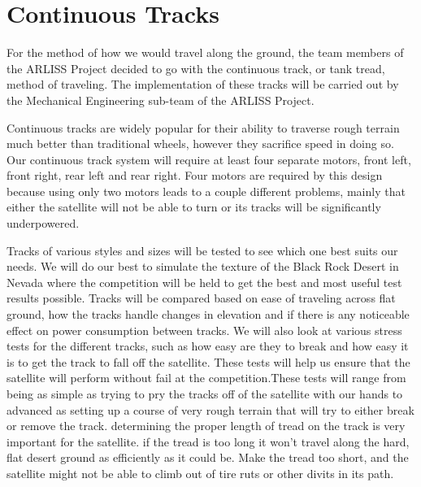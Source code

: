 \documentclass[10pt,letterpaper,onecolumn,journal]{IEEEtran}
\begin{document}
\section{Continuous Tracks}
\par
For the method of how we would travel along the ground, the team members of the ARLISS Project decided to go with the continuous track, or tank tread, method of traveling. The implementation of these tracks will be carried out by the Mechanical Engineering sub-team of the ARLISS Project.\vspace{.3cm}
\par
Continuous tracks are widely popular for their ability to traverse rough terrain much better than traditional wheels, however they sacrifice speed in doing so. Our continuous track system will require at least four separate motors, front left, front right, rear left and rear right. Four motors are required by this design because using only two motors leads to a couple different problems, mainly that either the satellite will not be able to turn or its tracks will be significantly underpowered.\vspace{.3cm}
\par
Tracks of various styles and sizes will be tested to see which one best suits our needs. We will do our best to simulate the texture of the Black Rock Desert in Nevada where the competition will be held to get the best and most useful test results possible. Tracks will be compared based on ease of traveling across flat ground, how the tracks handle changes in elevation and if there is any noticeable effect on power consumption between tracks. We will also look at various stress tests for the different tracks, such as how easy are they to break and how easy it is to get the track to fall off the satellite. These tests will help us ensure that the satellite will perform without fail at the competition.These tests will range from being as simple as trying to pry the tracks off of the satellite with our hands to advanced as setting up a course of very rough terrain that will try to either break or remove the track. determining the proper length of tread on the track is very important for the satellite. if the tread is too long it won't travel along the hard, flat desert ground as efficiently as it could be. Make the tread too short, and the satellite might not be able to climb out of tire ruts or other divits in its path. \vspace{.3cm}
\par
\end{document}
